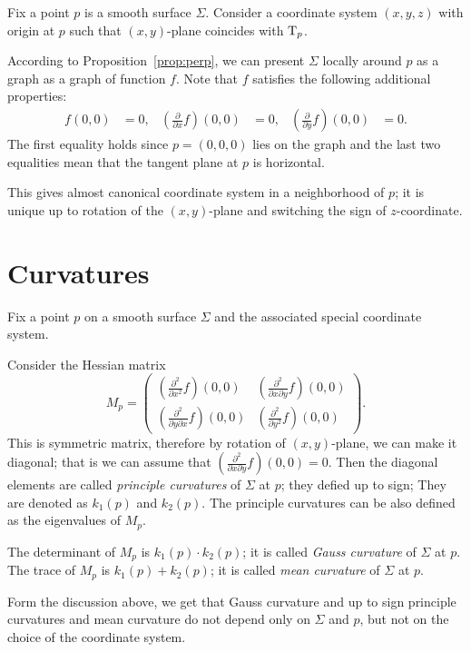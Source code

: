 Fix a point $p$ is a smooth surface $\Sigma$.
Consider a coordinate system $(x,y,z)$ with origin at $p$ such that $(x,y)$-plane coincides with $\mathrm{T}_p$.

According to Proposition~\ref{prop:perp}, 
we can present $\Sigma$ locally around $p$ as a graph as a graph of function $f$.
Note that $f$ satisfies the following additional properties:
\begin{align*}
f(0,0)&=0,
&
(\tfrac{\partial}{\partial x}f)(0,0)&=0,
&
(\tfrac{\partial}{\partial y}f)(0,0)&=0.
\end{align*}
The first equality holds since $p=(0,0,0)$ lies on the graph and the last two equalities mean that the tangent plane at $p$ is horizontal.

This gives almost canonical coordinate system in a neighborhood of $p$;
it is unique up to rotation of  the $(x,y)$-plane and switching the sign of $z$-coordinate.

\section{Curvatures}

Fix a point $p$ on a smooth surface $\Sigma$ and the associated special coordinate system. 

Consider the Hessian matrix 
\[M_p=\begin{pmatrix}
   (\tfrac{\partial^2}{\partial x^2}f)(0,0)
   &(\tfrac{\partial^2}{\partial x\partial y}f)(0,0)
   \\
   (\tfrac{\partial^2}{\partial y\partial x}f)(0,0)
   &(\tfrac{\partial^2}{\partial y^2}f)(0,0)
  \end{pmatrix}.
\]
This is symmetric matrix, therefore by rotation of $(x,y)$-plane, we can make it diagonal;
that is we can assume that $(\tfrac{\partial^2}{\partial x\partial y}f)(0,0)=0$.
Then the diagonal elements are called \emph{principle curvatures} of $\Sigma$ at $p$;
they defied up to sign;
They are denoted as $k_1(p)$ and $k_2(p)$.
The principle curvatures can be also defined as the eigenvalues of $M_p$.

The determinant of $M_p$ is $k_1(p)\cdot k_2(p)$;
it is called \emph{Gauss curvature} of $\Sigma$ at $p$.
The trace of $M_p$ is $k_1(p)+ k_2(p)$;
it is called \emph{mean curvature} of $\Sigma$ at $p$.

Form the discussion above, 
we get that Gauss curvature and up to sign principle curvatures and mean curvature 
do not depend only on $\Sigma$ and $p$,
but not on the choice of the coordinate system.

